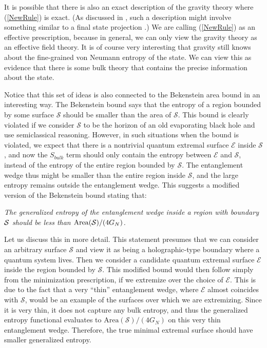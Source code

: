 \documentclass[12pt]{article}
\def\nref#1{(\ref{#1})}
\begin{document}
It is possible that there is also an exact description of the gravity theory where \nref{NewRule} is exact. 
(As discussed in \cite{Penington:2019npb}, such a description might involve something similar to a final state projection \cite{Horowitz:2003he}.)
We are calling (\ref{NewRule}) as an effective prescription, because in general, we can only view the gravity theory as an effective field theory. 
It is of course very interesting that gravity still knows about the fine-grained von Neumann entropy of the state. 
We can view this as evidence that there is some bulk theory that contains the precise information about the state. 
  
Notice that this set of ideas is also connected to the Bekenstein area bound in an interesting way. 
The Bekenstein bound says that the entropy of a region bounded by some surface $\mathcal{S}$ should be smaller than the area of $\mathcal{S}$.
This bound is clearly violated if we consider $\mathcal{S}$ to be the horizon of an old evaporating black hole and use semiclassical reasoning.
However, in such situations when the bound is violated, we expect that there is a nontrivial quantum extremal surface $\mathcal{E}$ inside $\mathcal{S}$, and now the $S_{bulk}$ term should only contain the entropy between $\mathcal{E}$ and $\mathcal{S}$, instead of the entropy of the entire region bounded by $\mathcal{S}$.
The entanglement wedge thus might be smaller than the entire region inside $\mathcal{S}$, and the large entropy remains outside the entanglement wedge. 
This suggests a modified version of the Bekenstein bound stating that:

\begin{flushleft}
{\it The generalized entropy of the entanglement wedge inside a region with boundary ${\cal S}$   should be less than ${\rm Area}({\cal S}) /(4 G_N)$.}  
\end{flushleft}

Let us discuss this in more detail. 
This statement presumes that we can consider an arbitrary surface $\mathcal{S}$ and view it as being a holographic-type boundary where a quantum system lives.
Then we consider a candidate quantum extremal surface $\mathcal{E}$ inside the region bounded by $\mathcal{S}$. 
This modified bound would then follow simply from the minimization prescription, if we extremize over the choice of $\mathcal{E}$.
This is due to the fact that a very ``thin'' entanglement wedge, where $\mathcal{E}$ almost coincides with $\mathcal{S}$, would be an example of the surfaces over which we are extremizing. 
Since it is very thin, it does not capture any bulk entropy, and thus the generalized entropy functional evaluates to $\text{Area}(\mathcal{S})/(4G_N)$ on this very thin entanglement wedge.
Therefore, the true minimal extremal surface should have smaller generalized entropy. 
 
\end{document}
